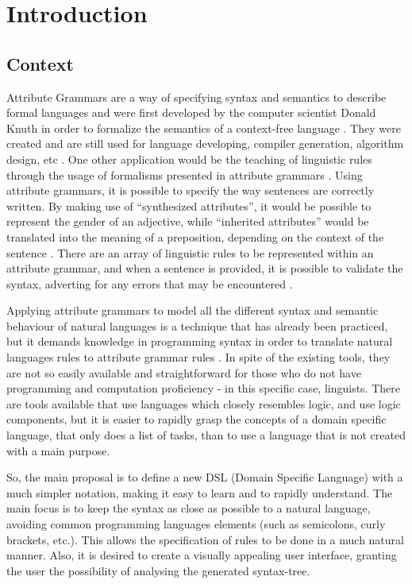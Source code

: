 \chapter{Introduction} \label{introduction}
	
\section{Context}
Attribute Grammars are a way of specifying syntax and semantics to describe formal languages \cite{hafiz_2011} and were first developed by the computer scientist Donald Knuth in order to formalize the semantics of a context-free language \cite{slonneger_1995}. They were created and are still used for language developing, compiler generation, algorithm design, etc \cite{thirunarayan_2009}. One other application would be the teaching of linguistic rules through the usage of formalisms presented in attribute grammars \cite{horakova_2014}. Using attribute grammars, it is possible to specify the way sentences are correctly written. By making use of ``synthesized attributes'', it would be possible to represent the gender of an adjective, while ``inherited attributes'' would be translated into the meaning of a preposition, depending on the context of the sentence \cite{donald_1990}.
There are an array of linguistic rules to be represented within an attribute grammar, and when a sentence is provided, it is possible to validate the syntax, adverting for any errors that may be encountered \cite{barros_2017}.

Applying attribute grammars to model all the different syntax and semantic behaviour of natural languages is a technique that has already been practiced, but it demands knowledge in programming syntax in order to translate natural languages rules to attribute grammar rules \cite{hafiz_2011}. In spite of the existing tools, they are not so easily available and straightforward for those who do not have programming and computation proficiency - in this specific case, linguists. There are tools available that use languages which closely resembles logic, and use logic components, but it is easier to rapidly grasp the concepts of a domain specific language, that only does a list of tasks, than to use a language that is not created with a main purpose.
    
So, the main proposal is to define a new \textsc{DSL} (Domain Specific Language) with a much simpler notation, making it easy to learn and to rapidly understand. The main focus is to keep the syntax as close as possible to a natural language, avoiding common programming languages elements (such as semicolons, curly brackets, etc.). This allows the specification of rules to be done in a much natural manner. Also, it is desired to create a visually appealing user interface, granting the user the possibility of analysing the generated syntax-tree.

